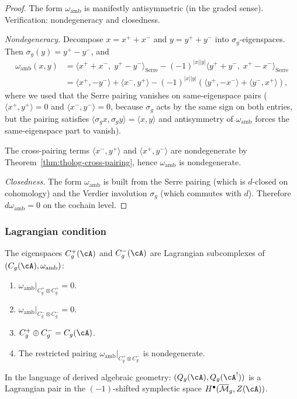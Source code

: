 \begin{proof}
The form $\omega_{\mathrm{amb}}$ is manifestly antisymmetric
(in the graded sense).
Verification: nondegeneracy and closedness.

\emph{Nondegeneracy.}
Decompose $x = x^+ + x^-$ and $y = y^+ + y^-$ into
$\sigma_g$-eigenspaces.
Then $\sigma_g(y) = y^+ - y^-$, and
\begin{align*}
\omega_{\mathrm{amb}}(x, y)
&= \langle x^+ + x^-,\; y^+ - y^- \rangle_{\mathrm{Serre}}
- (-1)^{|x||y|}\langle y^+ + y^-,\; x^+ - x^- \rangle_{\mathrm{Serre}} \\
&= \langle x^+, -y^- \rangle + \langle x^-, y^+ \rangle
- (-1)^{|x||y|}(\langle y^+, -x^- \rangle
+ \langle y^-, x^+ \rangle),
\end{align*}
where we used that the Serre pairing vanishes on same-eigenspace
pairs ($\langle x^+, y^+ \rangle = 0$ and
$\langle x^-, y^- \rangle = 0$, because $\sigma_g$ acts by the
same sign on both entries, but the pairing satisfies
$\langle \sigma_g x, \sigma_g y \rangle = \langle x, y \rangle$
and antisymmetry of $\omega_{\mathrm{amb}}$ forces the
same-eigenspace part to vanish).

The cross-pairing terms $\langle x^-, y^+ \rangle$ and
$\langle x^+, y^- \rangle$ are nondegenerate by
Theorem~\ref{thm:tholog-cross-pairing}, hence
$\omega_{\mathrm{amb}}$ is nondegenerate.

\emph{Closedness.}
The form $\omega_{\mathrm{amb}}$ is built from the
Serre pairing (which is $d$-closed on cohomology) and
the Verdier involution $\sigma_g$ (which commutes with $d$).
Therefore $d\omega_{\mathrm{amb}} = 0$ on the cochain level.
\end{proof}

\subsubsection{Lagrangian condition}

\begin{theorem}
\label{thm:tholog-lagrangian}
The eigenspaces $C_g^+(\cA)$ and $C_g^-(\cA)$ are
Lagrangian subcomplexes of $(C_g(\cA), \omega_{\mathrm{amb}})$:
\begin{enumerate}[label=\textup{(\roman*)}]
\item $\omega_{\mathrm{amb}}|_{C_g^+ \otimes C_g^+} = 0$.
\item $\omega_{\mathrm{amb}}|_{C_g^- \otimes C_g^-} = 0$.
\item $C_g^+ \oplus C_g^- = C_g(\cA)$.
\item The restricted pairing
 $\omega_{\mathrm{amb}}|_{C_g^+ \otimes C_g^-}$
 is nondegenerate.
\end{enumerate}
In the language of derived algebraic geometry:
$(Q_g(\cA), Q_g(\cA^!))$ is a Lagrangian pair in the
$(-1)$-shifted symplectic space
$H^\bullet(\Mbar_g, Z(\cA))$.
\end{theorem}


